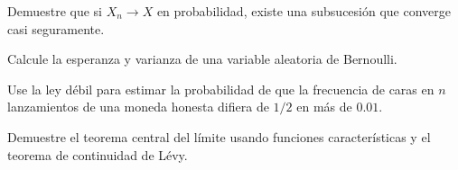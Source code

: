 \begin{exercise}
Demuestre que si $X_n\to X$ en probabilidad, existe una subsucesión que converge casi seguramente.
\end{exercise}

\begin{exercise}
Calcule la esperanza y varianza de una variable aleatoria de Bernoulli.
\end{exercise}

\begin{exercise}
Use la ley débil para estimar la probabilidad de que la frecuencia de caras en $n$ lanzamientos de una moneda honesta difiera de $1/2$ en más de $0.01$.
\end{exercise}

\begin{problem}
Demuestre el teorema central del límite usando funciones características y el teorema de continuidad de Lévy.
\end{problem}
